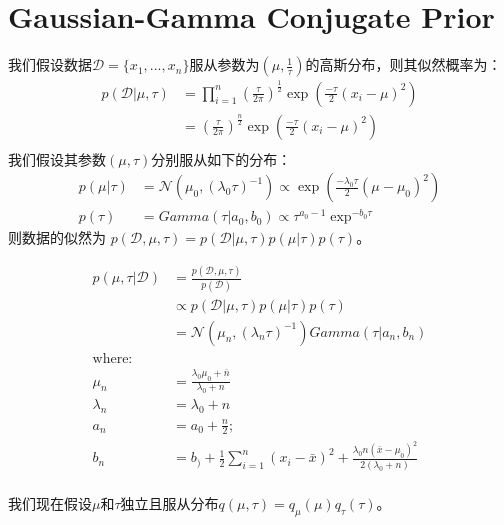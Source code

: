 \section{Gaussian-Gamma Conjugate Prior}
我们假设数据$\mathcal{D}=\{ x_1,...,x_n \}$服从参数为$(\mu, \frac{1}{\tau})$的高斯分布，则其似然概率为：
\begin{displaymath}
\begin{split}
p(\mathcal{D}|\mu, \tau) &= \prod_{i=1}^{n}\left ( \frac{\tau}{2 \pi} \right )^{\frac{1}{2}} \exp \left ( \frac{-\tau}{2} (x_i - \mu)^2 \right )\\
&=\left ( \frac{\tau}{2 \pi} \right )^{\frac{n}{2}}  \exp \left ( \frac{-\tau}{2} (x_i - \mu)^2 \right )\\
\end{split}
\end{displaymath}
我们假设其参数$(\mu, \tau)$分别服从如下的分布：
\begin{displaymath}
\begin{split}
p(\mu | \tau) &= \mathcal{N}(\mu_0, (\lambda_0 \tau)^{-1}) 
\propto \exp \left ( \frac{-\lambda_0 \tau}{2} (\mu - \mu_0)^2 \right )\\
p(\tau) &= Gamma(\tau|a_0, b_0) \propto \tau^{a_0-1} \exp^{-b_0 \tau}
\end{split}
\end{displaymath}
则数据的似然为 $p(\mathcal{D}, \mu, \tau) = p(\mathcal{D} | \mu, \tau) p(\mu|\tau) p(\tau)$。

\begin{displaymath}
\begin{split}
p(\mu, \tau|\mathcal{D}) &= \frac{p(\mathcal{D}, \mu, \tau)}{p(\mathcal{D})}\\
& \propto p(\mathcal{D}|\mu, \tau) p(\mu|\tau)p(\tau)\\
&= \mathcal{N}(\mu_n, (\lambda_n \tau)^{-1})  Gamma(\tau|a_n, b_n)\\
\text{where:}&\\
\mu_n &= \frac{\lambda_0 \mu_0 + \bar{n}}{\lambda_0 + n}\\
\lambda_n &= \lambda_0 +n\\
a_n &= a_0+\frac{n}{2};\\
b_n &= b_) + \frac{1}{2}\sum_{i=1}^{n}{(x_i - \bar{x})^2} + \frac{\lambda_0 n (\bar{x}-\mu_0)^2}{2(\lambda_0+n)}\\
\end{split}
\end{displaymath}

我们现在假设$\mu$和$\tau$独立且服从分布$q(\mu, \tau) = q_\mu(\mu) q_{\tau}(\tau)$。

